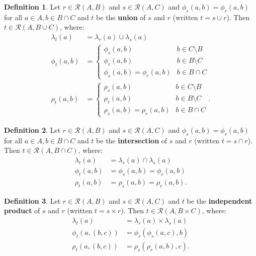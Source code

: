 \documentclass{article}
\theoremstyle{definition}
\newtheorem{definition}{Definition}[subsection]
\theoremstyle{plain}
\def\rule{\mathcal{R}}
\begin{document}
\begin{definition}
  Let $ r \in \rule (A, B) $
  and $ s \in \rule (A, C) $
  and $ \phi_s (a, b) = \phi_r (a, b) $
  for all $ a \in A, b \in B \cap C $
  and $ t $ be the \textbf{union} of $ s $ and $ r $
  (written $ t = s \cup r $).
  Then $ t \in \rule (A, B \cup C) $, where:
  \begin{align}
    \lambda_t (a)    & = \lambda_r (a) \cup \lambda_s (a) \\
       \phi_t (a, b) & = \begin {cases}
                           \phi_s (a, b)                 & b \in C \setminus B \\
                           \phi_r (a, b)                 & b \in B \setminus C \\
                           \phi_s (a, b) = \phi_r (a, b) & b \in B \cap C
                         \end{cases} \\
        \rho_t (a, b) & = \begin {cases}
                           \rho_s (a, b)                 & b \in C \setminus B \\
                           \rho_r (a, b)                 & b \in B \setminus C \\
                           \rho_s (a, b) = \rho_r (a, b) & b \in B \cap C
                         \end{cases}. 
  \end{align}
\end{definition}

\begin{definition}
  Let $ r \in \rule (A, B) $
  and $ s \in \rule (A, C) $
  and $ \phi_s (a, b) = \phi_r (a, b) $
  for all $ a \in A, b \in B \cap C $
  and $ t $ be the \textbf{intersection} of $ s $ and $ r $
  (written $ t = s \cap r $).
  Then $ t \in \rule (A, B \cap C) $, where:
  \begin{align}
    \lambda_t (a)    & = \lambda_r (a) \cap \lambda_s (a) \\
       \phi_t (a, b) & = \phi_s (a, b) = \phi_r (a, b) \\
       \rho_t (a, b) & = \rho_s (a, b) = \rho_r (a, b).
  \end{align}
\end{definition}

\begin{definition}
  Let $ r \in \rule (A, B) $
  and $ s \in \rule (A, C) $
  and $ t $ be the \textbf{independent product} of $ s $ and $ r $
  (written $ t = s \times r $).
  Then $ t \in \rule (A, B \times C) $, where:
  \begin{align}
    \lambda_t (a)         & = \lambda_r (a) \times \lambda_s (a) \\
       \phi_t (a, (b, c)) & =    \phi_r (\phi_s (a, c), b) \\
       \rho_t (a, (b, c)) & =    \rho_s (\rho_r (a, b), c).
  \end{align}
\end{definition}
\end{document}
